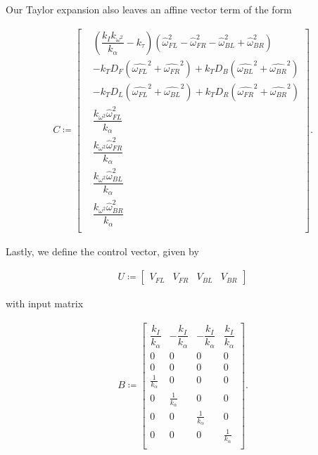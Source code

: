 \documentclass{article}
\begin{document}
Our Taylor expansion also leaves an affine vector term of the form

\begin{equation}
\begin{aligned} C \coloneqq 
    \begin{bmatrix}
        & \left(\dfrac{k_I k_{\omega^2}}{k_\alpha} - k_\tau\right) \left( \widehat{\omega}_{FL}^2 - \widehat{\omega}_{FR}^2 - \widehat{\omega}_{BL}^2 + \widehat{\omega}_{BR}^2\right)\\
        & -k_T D_F(\widehat{\omega_{FL}}^2 + \widehat{\omega_{FR}}^2) + k_T D_B(\widehat{\omega_{BL}}^2 + \widehat{\omega_{BR}}^2)\\
        & - k_T D_L(\widehat{\omega_{FL}}^2 + \widehat{\omega_{BL}}^2) + k_T D_R(\widehat{\omega_{FR}}^2 + \widehat{\omega_{BR}}^2)\\
        & \dfrac{k_{\omega^2}\widehat{\omega}_{FL}^2}{k_\alpha}\\
        & \dfrac{k_{\omega^2}\widehat{\omega}_{FR}^2}{k_\alpha}\\
        & \dfrac{k_{\omega^2}\widehat{\omega}_{BL}^2}{k_\alpha}\\
        & \dfrac{k_{\omega^2}\widehat{\omega}_{BR}^2}{k_\alpha}\\
    \end{bmatrix}.
\end{aligned} 
\end{equation}

Lastly, we define the control vector, given by

\begin{equation}
\begin{aligned}U \coloneqq 
    \begin{bmatrix}
        V_{FL} & V_{FR} & V_{BL} & V_{BR}
    \end{bmatrix}
\end{aligned} 
\end{equation}

with input matrix

\begin{equation}
\begin{aligned}B \coloneqq 
    \begin{bmatrix}
        \dfrac{k_I}{k_\alpha}  & -\dfrac{k_I}{k_\alpha} & -\dfrac{k_I}{k_\alpha} & \dfrac{k_I}{k_\alpha} \\
        0 & 0 & 0 & 0\\
        0 & 0 & 0 & 0\\
        \frac{1}{k_\alpha} & 0 & 0 & 0\\
        0 & \frac{1}{k_\alpha} & 0 & 0\\
        0 & 0 & \frac{1}{k_\alpha} & 0\\
        0 & 0 & 0 & \frac{1}{k_\alpha}\\
    \end{bmatrix}.
\end{aligned} 
\end{equation}\\
\end{document}
